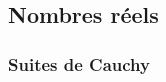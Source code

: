 %
%
%
%
%
%
%    
%
%
%
%
%
%
%
%
%
%

\subsection{Nombres réels}

\subsubsection{Suites de Cauchy}
\label{subsub:Cauchy}

